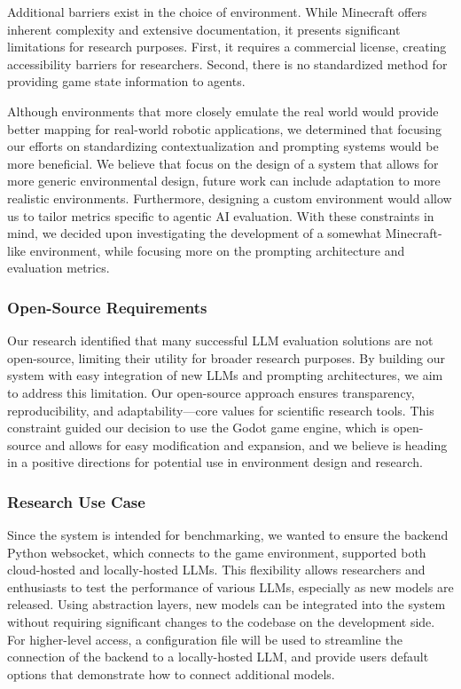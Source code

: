 \documentclass{article}
\begin{document}
Additional barriers exist in the choice of environment. While Minecraft offers inherent complexity and extensive documentation, it presents significant limitations for research purposes.
First, it requires a commercial license, creating accessibility barriers for researchers.
Second, there is no standardized method for providing game state information to agents.

Although environments that more closely emulate the real world would provide better mapping for real-world robotic applications, we determined that focusing our efforts on standardizing contextualization and prompting systems would be more beneficial.
We believe that focus on the design of a system that allows for more generic environmental design, future work can include adaptation to more realistic environments.
Furthermore, designing a custom environment would allow us to tailor metrics specific to agentic AI evaluation.
With these constraints in mind, we decided upon investigating the development of a somewhat Minecraft-like environment, while focusing more on the prompting architecture and evaluation metrics.


\subsubsection{Open-Source Requirements}
Our research identified that many successful LLM evaluation solutions are not open-source, limiting their utility for broader research purposes.
By building our system with easy integration of new LLMs and prompting architectures, we aim to address this limitation.
Our open-source approach ensures transparency, reproducibility, and adaptability—core values for scientific research tools.
This constraint guided our decision to use the Godot game engine, which is open-source and allows for easy modification and expansion, and we believe is heading in a positive directions for potential use in environment design and research.

\subsubsection{Research Use Case}
Since the system is intended for benchmarking, we wanted to ensure the backend Python websocket, which connects to the game environment, supported both cloud-hosted and locally-hosted LLMs.
This flexibility allows researchers and enthusiasts to test the performance of various LLMs, especially as new models are released.
Using abstraction layers, new models can be integrated into the system without requiring significant changes to the codebase on the development side.
For higher-level access, a configuration file will be used to streamline the connection of the backend to a locally-hosted LLM, and provide users default options that demonstrate how to connect additional models.
\end{document}

